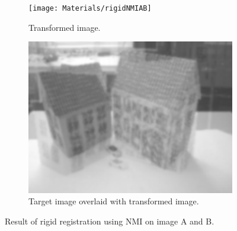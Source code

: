 \begin{figure}[h]
	\centering
	\begin{subfigure}{0.4\linewidth}
		\centering
		\texttt{[image: Materials/rigidNMIAB]}
		\caption{Transformed image.\newline}
	\end{subfigure}
	\hspace{1cm}
	\begin{subfigure}{0.4\linewidth}
		\centering
		\includegraphics[width=\linewidth]{Materials/rigidNMIABO}
		\caption{Target image overlaid with transformed image.}
	\end{subfigure}
	\caption{Result of rigid registration using NMI on image A and B.}
	\label{rigidNMIAB}
\end{figure}

